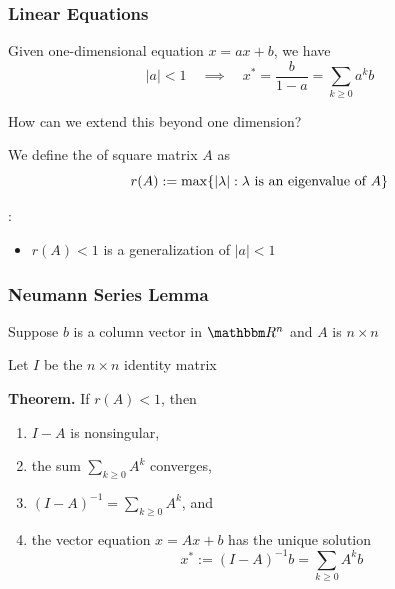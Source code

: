 \begin{frame}
     \frametitle{Linear Equations}   

    Given one-dimensional equation $x = ax + b$, we have 
    \begin{equation*}
        |a| < 1 \quad \implies \quad
        x^* = \frac{b}{1-a} = \sum_{k \geq 0} a^k b
    \end{equation*}

    How can we extend this beyond one dimension?

    \vspace{1em}
    We define the  of square matrix $A$ as
    \begin{equation*}
        r(A) := \max\{ |\lambda| : \lambda \text{ is an eigenvalue of } A \}    
    \end{equation*}

    : 
    \begin{itemize}
        \item $r(A)<1$ is a generalization of $|a|<1$
    \end{itemize}


\end{frame}


\begin{frame}
    \frametitle{Neumann Series Lemma}

    Suppose $b$ is a column vector in $\RR^n$ and $A$ is $n \times n$ 

    \vspace{0.5em}
    Let $I$ be the $n \times n$ identity matrix

    \vspace{0.5em}
    {\bf Theorem.} 
    If $r(A) < 1$, then
    \begin{enumerate}
        \item $I - A$ is nonsingular, 
        \vspace{0.5em}
        \item the sum $\sum_{k \geq 0} A^k$ converges, 
        \vspace{0.5em}
        \item $(I - A)^{-1} = \sum_{k \geq 0} A^k$, and
        \vspace{0.5em}
        \item the vector equation $x = A x + b$ has the unique solution 
            \begin{equation*}
                x^* := (I - A)^{-1} b = \sum_{k \geq 0} A^k b
            \end{equation*}
    \end{enumerate}

    
\end{frame}

